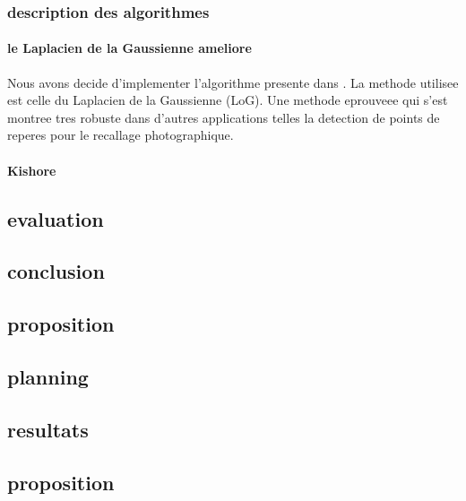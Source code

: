 \subsubsection{description des algorithmes}
\paragraph{le Laplacien de la Gaussienne ameliore}
Nous avons decide d'implementer l'algorithme presente dans \cite{al2009improved}. La methode utilisee est celle du Laplacien de la Gaussienne (LoG). Une methode eprouveee qui s'est montree tres robuste dans d'autres applications telles la detection de points de reperes pour le recallage photographique.



\paragraph{Kishore}



\subsection {evaluation}



\subsection {conclusion}


\subsection {proposition}



\subsection {planning}


\subsection{resultats}

\subsection{proposition}





